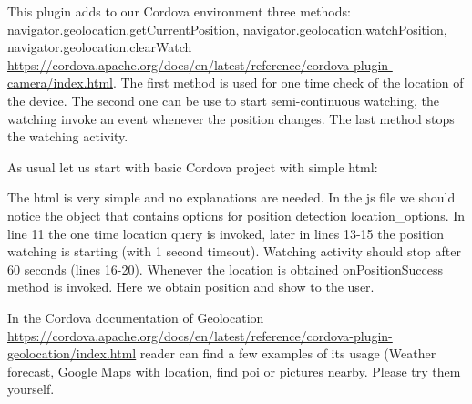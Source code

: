 This plugin adds to our Cordova environment three methods: navigator.geolocation.getCurrentPosition, navigator.geolocation.watchPosition, navigator.geolocation.clearWatch \url{https://cordova.apache.org/docs/en/latest/reference/cordova-plugin-camera/index.html}. The first method is used for one time check of the location of the device. The second one can be use to start semi-continuous watching, the watching invoke an event whenever the position changes. The last method stops the watching activity.

As usual let us start with basic Cordova project with simple html:



\begin{explain}
The html is very simple and no explanations are needed. In the js file we should notice the object that contains options for position detection location\_options. In line 11 the one time location query is invoked, later in lines 13-15 the position watching is starting (with 1 second timeout). Watching activity should stop after 60 seconds (lines 16-20). Whenever the location is obtained onPositionSuccess method is invoked. Here we obtain position and show to the user.
\end{explain}

\begin{extercises}
  In the Cordova documentation of Geolocation \url{https://cordova.apache.org/docs/en/latest/reference/cordova-plugin-geolocation/index.html} reader can find a few examples of its usage (Weather forecast, Google Maps with location, find poi or pictures nearby. Please try them yourself.
\end{extercises} 






